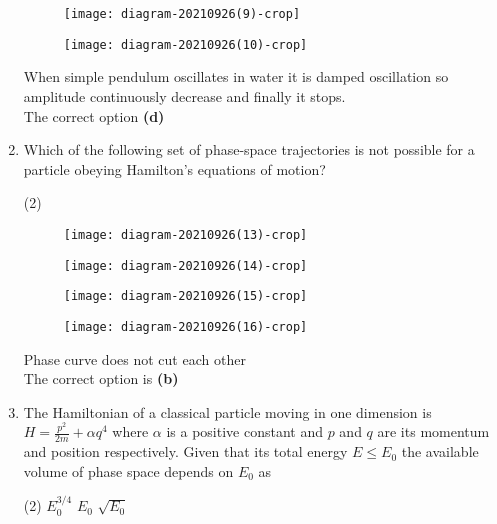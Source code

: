 \begin{enumerate}
\begin{tasks}
\begin{figure}[H]
		\centering
		\texttt{[image: diagram-20210926(9)-crop]}
	\end{figure}
	\task[\textbf{D.}]\begin{figure}[H]
		\centering
		\texttt{[image: diagram-20210926(10)-crop]}
	\end{figure}
\end{tasks}
\begin{answer}
 When simple pendulum oscillates in water it is damped oscillation so amplitude continuously decrease and finally it stops.\\
 The correct option \textbf{(d)}
\end{answer}
	\item Which of the following set of phase-space trajectories is not possible for a particle obeying Hamilton's equations of motion?
	{}
\begin{tasks}(2)
	\task[\textbf{A.}]\begin{figure}[H]
		\centering
		\texttt{[image: diagram-20210926(13)-crop]}
	\end{figure}
	\task[\textbf{B.}]\begin{figure}[H]
		\centering
		\texttt{[image: diagram-20210926(14)-crop]}
	\end{figure}
	\task[\textbf{C.}]\begin{figure}[H]
		\centering
		\texttt{[image: diagram-20210926(15)-crop]}
	\end{figure}
	\task[\textbf{D.}]\begin{figure}[H]
		\centering
		\texttt{[image: diagram-20210926(16)-crop]}
	\end{figure}
\end{tasks}
\begin{answer}
 Phase curve does not cut each other \\
The correct option is \textbf{(b)}
\end{answer}
	\item The Hamiltonian of a classical particle moving in one dimension is $H=\frac{p^{2}}{2 m}+\alpha q^{4}$ where $\alpha$ is a positive constant and $p$ and $q$ are its momentum and position respectively. Given that its total energy $E \leq E_{0}$ the available volume of phase space depends on $E_{0}$ as
	{}
\begin{tasks}(2)
	\task[\textbf{A.}] $E_{0}^{3 / 4}$
	\task[\textbf{B.}]$E_{0}$
	\task[\textbf{C.}]$\sqrt{E_{0}}$

\end{tasks}
\end{enumerate}
